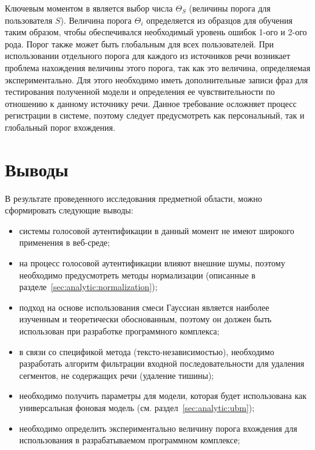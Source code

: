 Ключевым моментом в  является выбор числа $\Theta_{S}$ (величины порога для пользователя $S$). Величина порога $\Theta_i$ определяется из образцов для обучения таким образом, чтобы обеспечивался необходимый уровень ошибок 1-ого и 2-ого рода. Порог также может быть глобальным для всех пользователей. При использовании отдельного порога для каждого из источников речи возникает проблема нахождения величины этого порога, так как это величина, определяемая экспериментально. Для этого необходимо иметь дополнительные записи фраз для тестирования полученной модели и определения ее чувствительности по отношению к данному источнику речи. Данное требование осложняет процесс регистрации в системе, поэтому следует предусмотреть как персональный, так и глобальный порог вхождения.

\section{Выводы}
\label{sec:analytic:conclusion}

В результате проведенного исследования предметной области, можно сформировать следующие выводы:

\begin{itemize}
\item системы голосовой аутентификации в данный момент не имеют широкого применения в веб-среде;
\item на процесс голосовой аутентификации влияют внешние шумы, поэтому необходимо предусмотреть методы нормализации (описанные в разделе~\ref{sec:analytic:normalization});
\item подход на основе использования смеси Гауссиан является наиболее изученным и теоретически обоснованным, поэтому он должен быть использован при разработке программного комплекса;
\item в связи со спецификой метода (тексто-независимостью), необходимо разработать алгоритм фильтрации входной последовательности для удаления сегментов, не содержащих речи (удаление тишины);
\item необходимо получить параметры для модели, которая будет использована как универсальная фоновая модель (см. раздел~\ref{sec:analytic:ubm});
\item необходимо определить экспериментально величину порога вхождения для использования в разрабатываемом программном комплексе;
\end{itemize}

